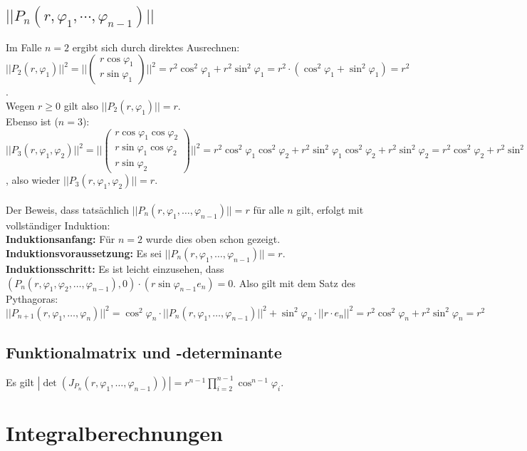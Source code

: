\documentclass[a4paper,11pt]{report}
\theoremstyle{definition}
\begin{document}
\section{$||P_n(r,\varphi_1,\cdots,\varphi_{n-1})||$}
Im Falle $n=2$ ergibt sich durch direktes Ausrechnen:\\
$||P_2(r,\varphi_1)||^2=||\begin{pmatrix}r\cos\varphi_1\\ r\sin\varphi_1\end{pmatrix}||^2=
r^2\cos^2\varphi_1+r^2\sin^2\varphi_1=r^2\cdot(\cos^2\varphi_1+\sin^2\varphi_1)=r^2$.\\
Wegen $r\geq 0$ gilt also $||P_2(r,\varphi_1)||=r$.\\
Ebenso ist ($n=3$): $||P_3(r,\varphi_1,\varphi_2)||^2=
||\begin{pmatrix}r\cos\varphi_1\cos\varphi_2\\ r\sin\varphi_1\cos\varphi_2\\ r\sin\varphi_2\end{pmatrix}||^2=
r^2\cos^2\varphi_1\cos^2\varphi_2+r^2\sin^2\varphi_1\cos^2\varphi_2+r^2\sin^2\varphi_2
=r^2\cos^2\varphi_2+r^2\sin^2\varphi_2=r^2$, also wieder $||P_3(r,\varphi_1,\varphi_2)||=r$.\\ \\
Der Beweis, dass tatsächlich $||P_n(r,\varphi_1,\ldots,\varphi_{n-1})||=r$ für alle $n$ gilt, erfolgt mit vollständiger Induktion:\\
\textbf{Induktionsanfang:} Für $n=2$ wurde dies oben schon gezeigt. \checkmark\\
\textbf{Induktionsvoraussetzung:} Es sei $||P_n(r,\varphi_1,\ldots,\varphi_{n-1})||=r$.\\
\textbf{Induktionsschritt:} Es ist leicht einzusehen, dass $(P_n(r,\varphi_1, \varphi_2, \ldots, \varphi_{n-1}), 0)\cdot (r\sin\varphi_{n-1}e_n) = 0$. 
Also gilt mit dem Satz des Pythagoras:\\
$||P_{n+1}(r,\varphi_1,\ldots,\varphi_n)||^2=\cos^2\varphi_n\cdot||P_n(r,\varphi_1,\ldots,\varphi_{n-1})||^2 +\sin^2\varphi_n\cdot||r\cdot e_n||^2=r^2\cos^2\varphi_n+r^2\sin^2\varphi_n=r^2$ \checkmark

\section{Funktionalmatrix und -determinante}
Es gilt $|\det(J_{P_n}(r,\varphi_1,\ldots,\varphi_{n-1}))|=r^{n-1}\prod\limits_{i=2}^{n-1}\cos^{n-1}\varphi_i$.
\chapter{Integralberechnungen}
\end{document}
